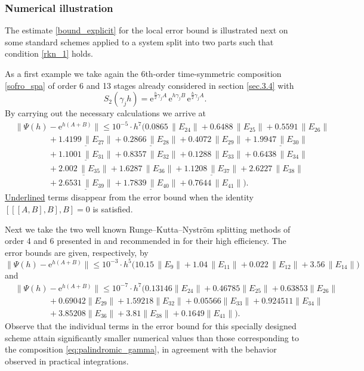 \documentclass[11pt]{article}
\newcommand{\e}{\ensuremath{\mathrm{e}}}
\begin{document}
\subsubsection{Numerical illustration}

The estimate \eqref{bound_explicit} for the local error bound is illustrated next on some standard schemes applied to a system
split into two parts such that condition \eqref{rkn_1} holds.

As a first example
we take again the 6th-order time-symmetric composition  \eqref{sofro_spa} of order 6 and 13 stages
already considered  in section \ref{sec.3.4} with 
\[
    S_2(\gamma_j h) = \e^{\frac{h}{2} \gamma_j A} \, \e^{h \gamma_j B} \, \e^{\frac{h}{2} \gamma_j A}.
\]
By carrying out the necessary calculations we arrive at    
\[
\begin{aligned}
  & \|\Psi(h) - \e^{h(A+B)}\|  \le  10^{-5} \cdot h^7 \Big(   0.0865  \, \|E_{24}\| +  0.6488  \, \|E_{25}\| + 0.5591 \, \|E_{26}\| \\
      & \qquad\qquad  + \underline{1.4199 \, \|E_{27}\|} + \underline{0.2866 \, \|E_{28}\|}  + 0.4072  \, \|E_{29}\| + \underline{1.9947  \, \|E_{30}\|} \\
     & \qquad\qquad + \underline{1.1001 \,  \|E_{31}\|} + 0.8357 \, \|E_{32}\| + 0.1288 \, \|E_{33}\| + 0.6438  \, \|E_{34}\| \\
     & \qquad\qquad + \underline{2.002 \, \|E_{35}\|} + 1.6287 \, \|E_{36}\| + \underline{1.1208 \, \|E_{37}\|} +   2.6227 \, \|E_{38}\| \\
     & \qquad\qquad  + \underline{2.6531 \, \|E_{39}\|} + \underline{1.7839 \, \|E_{40}\|} +  0.7644  \, \|E_{41}\|  \Big).
\end{aligned}
\]     
\underline{Underlined} terms disappear from the error bound when the identity $  [[[A,B],B],B] = 0$ is satisfied.

Next we take the two well known Runge--Kutta--Nystr\"om splitting methods of order 4 and 6 presented in \cite[Table 3]{blanes02psp}
and recommended in \cite{blanes24smf} for their high efficiency. The error bounds are given, respectively, by
\[
   \|\Psi(h) - \e^{h(A+B)}\|  \le  10^{-3} \cdot h^5 \Big( 10.15 \, \|E_{9}\| + 1.04 \, \|E_{11}\| + 0.022 \, \|E_{12}\| 
 + 3.56 \, \|E_{14}\| \Big)
\]
and
\[
\begin{aligned}
  & \|\Psi(h) - \e^{h(A+B)}\|  \le  10^{-7} \cdot h^7 \Big(   0.13146  \|E_{24}\| +  0.46785  \|E_{25}\| + 0.63853 \|E_{26}\| \\
     & \qquad\qquad + 0.69042  \|E_{29}\| + 1.59218 \|E_{32}\| + 0.05566 \|E_{33}\| + 0.924511  \|E_{34}\| \\
     & \qquad\qquad + 3.85208  \|E_{36}\| + 3.81  \|E_{38}\| + 0.1649  \|E_{41}\|  \Big).
\end{aligned}
\]     
Observe that the individual terms in the error bound for this specially designed scheme attain significantly smaller numerical values than those corresponding to the composition \eqref{eq:palindromic_gamma}, in agreement with the behavior observed in practical integrations.
\end{document}
